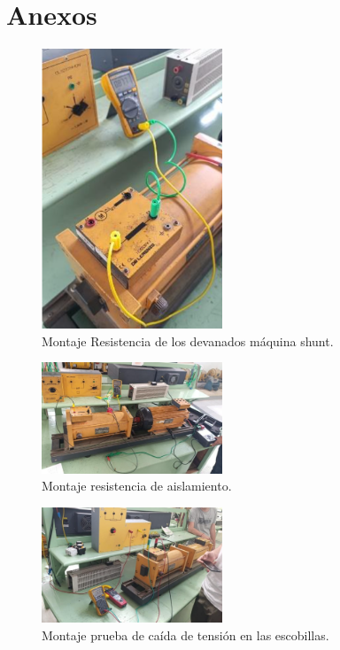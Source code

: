 \section*{Anexos}
\begin{figure}[ht!]
    \centering
    \includegraphics[width=0.48\textwidth, height=0.6\textwidth]{fot/Prac_6_A4.png}
    \caption{Montaje Resistencia de los devanados máquina shunt.}
    \label{fig:hoja}
\end{figure}

\begin{figure}[ht!]
    \centering
    \includegraphics[width=0.48\textwidth]{fot/Prac_6_A2.png}
    \caption{Montaje resistencia de aislamiento.}
    \label{fig:A2}
\end{figure}


\begin{figure}[ht!]
    \centering
    \includegraphics[width=0.48\textwidth]{fot/Prac_6_A1.png}
    \caption{Montaje prueba de caída de tensión en las escobillas.}
    \label{fig:A1}
\end{figure}



